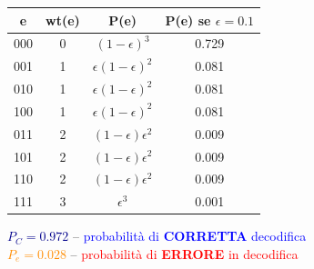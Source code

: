 
\begin{center}
\renewcommand{\arraystretch}{1.5}
\begin{tabular}{|c|c|c|c|}
    \hline
    \rowcolor{gray!20} \textbf{e} & \textbf{wt(e)} & \textbf{P(e)} & \textbf{P(e) se $\epsilon = 0.1$} \\ \hline
    
    \rowcolor{lightsuccess} 000 & 0 & $(1-\epsilon)^3$ & 0.729 \\ \hline
    \rowcolor{lightsuccess} 001 & 1 & $\epsilon(1-\epsilon)^2$ & 0.081 \\ \hline
    \rowcolor{lightsuccess} 010 & 1 & $\epsilon(1-\epsilon)^2$ & 0.081 \\ \hline
    \rowcolor{lightsuccess} 100 & 1 & $\epsilon(1-\epsilon)^2$ & 0.081 \\ \hline
    
    \rowcolor{lighterror} 011 & 2 & $(1-\epsilon)\epsilon^2$ & 0.009 \\ \hline
    \rowcolor{lighterror} 101 & 2 & $(1-\epsilon)\epsilon^2$ & 0.009 \\ \hline
    \rowcolor{lighterror} 110 & 2 & $(1-\epsilon)\epsilon^2$ & 0.009 \\ \hline
    \rowcolor{lighterror} 111 & 3 & $\epsilon^3$ & 0.001 \\ \hline
\end{tabular}

\vspace{0.5cm}
\begin{minipage}{\linewidth}
    \centering
    \small
    \textcolor{darkblue}{\textbf{$P_C = 0.972$}} -- \textcolor{blue}{probabilità di \textbf{CORRETTA} decodifica} \\[0.3em]
    \textcolor{darkorange}{\textbf{$P_e = 0.028$}} -- \textcolor{red}{probabilità di \textbf{ERRORE} in decodifica}
\end{minipage}
\end{center}